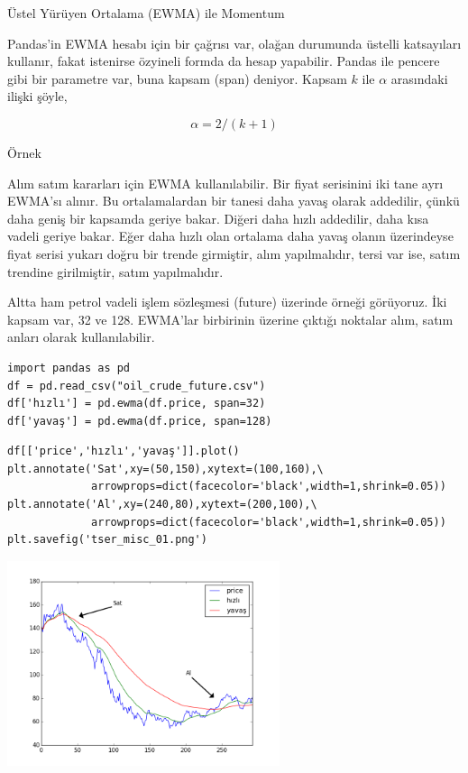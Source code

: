 \documentclass[12pt,fleqn]{article}\usepackage{../../common}
\begin{document}
Üstel Yürüyen Ortalama (EWMA) ile Momentum 

Pandas'in EWMA hesabı için bir çağrısı var, olağan durumunda üstelli
katsayıları kullanır, fakat istenirse özyineli formda da hesap yapabilir. 
Pandas ile pencere gibi bir parametre var, buna kapsam (span)
deniyor. Kapsam $k$ ile $\alpha$ arasındaki ilişki şöyle,

$$\alpha = 2/(k+1) $$

Örnek

Alım satım kararları için EWMA kullanılabilir. Bir fiyat serisinini iki 
tane ayrı EWMA'sı alınır. Bu ortalamalardan bir tanesi daha yavaş olarak
addedilir, çünkü daha geniş bir kapsamda geriye bakar. Diğeri daha hızlı 
addedilir, daha kısa vadeli geriye bakar. Eğer daha hızlı olan ortalama
daha yavaş olanın üzerindeyse fiyat serisi yukarı doğru bir trende
girmiştir, alım yapılmalıdır, tersi var ise, satım trendine girilmiştir,
satım yapılmalıdır. 

Altta ham petrol vadeli işlem sözleşmesi (future) üzerinde örneği
görüyoruz. İki kapsam var, 32 ve 128. EWMA'lar birbirinin üzerine çıktığı
noktalar alım, satım anları olarak kullanılabilir.

\begin{verbatim}
import pandas as pd
df = pd.read_csv("oil_crude_future.csv")
df['hızlı'] = pd.ewma(df.price, span=32)
df['yavaş'] = pd.ewma(df.price, span=128)
\end{verbatim}

\begin{verbatim}
df[['price','hızlı','yavaş']].plot()
plt.annotate('Sat',xy=(50,150),xytext=(100,160),\
             arrowprops=dict(facecolor='black',width=1,shrink=0.05))
plt.annotate('Al',xy=(240,80),xytext=(200,100),\
             arrowprops=dict(facecolor='black',width=1,shrink=0.05))
plt.savefig('tser_misc_01.png')
\end{verbatim}

\includegraphics[height=6cm]{tser_mom_06.png}
\end{document}
